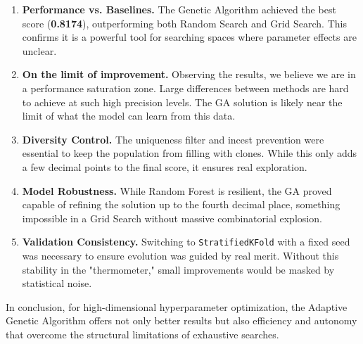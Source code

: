 \documentclass[12pt, a4paper]{article}
\begin{document}
\begin{enumerate}[itemsep=0.3em]
  \item \textbf{Performance vs. Baselines.} The Genetic Algorithm achieved the best
        score (\textbf{0.8174}), outperforming both Random Search and Grid Search.
        This confirms it is a powerful tool for searching spaces where parameter
        effects are unclear.

  \item \textbf{On the limit of improvement.} Observing the results, we believe we are
        in a performance saturation zone. Large differences between methods are
        hard to achieve at such high precision levels. The GA solution is likely near
        the limit of what the model can learn from this data.

  \item \textbf{Diversity Control.} The uniqueness filter and incest prevention were
        essential to keep the population from filling with clones. While this only
        adds a few decimal points to the final score, it ensures real exploration.

  \item \textbf{Model Robustness.} While Random Forest is resilient, the GA proved
        capable of refining the solution up to the fourth decimal place, something
        impossible in a Grid Search without massive combinatorial explosion.

  \item \textbf{Validation Consistency.} Switching to \texttt{StratifiedKFold} with a
        fixed seed was necessary to ensure evolution was guided by real merit.
        Without this stability in the "thermometer," small improvements would be masked
        by statistical noise.
\end{enumerate}

In conclusion, for high-dimensional hyperparameter optimization, the Adaptive Genetic
Algorithm offers not only better results but also efficiency and autonomy that
overcome the structural limitations of exhaustive searches.
\end{document}

